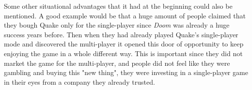 {Some other situational advantages that it had at the beginning could also be mentioned. A good example would be that a huge amount of people claimed that they bough Quake only for the single-player since \textit{Doom} was already a huge success years before. Then when they had already played Quake's single-player mode and discovered the multi-player it opened this door of opportunity to keep enjoying the game in a whole different way. This is important since they did not market the game for the multi-player, and people did not feel like they were gambling and buying this "new thing", they were investing in a single-player game in their eyes from a company they already trusted.\\

}

